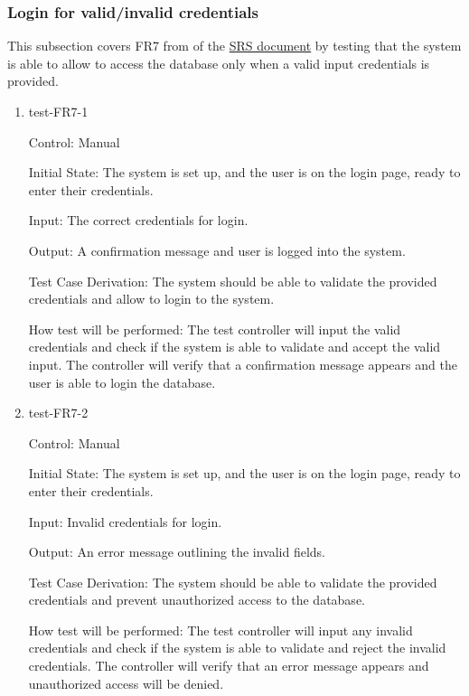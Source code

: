 \documentclass[12pt, titlepage]{article}
\begin{document}
\subsubsection{Login for valid/invalid credentials} \label{section:4.1.4}

This subsection covers FR7 from of the \href{https://github.com/Inreet-Kaur/capstone/blob/main/docs/SRS/SRS.pdf} {SRS document} by testing that the system is able to allow to access the database only when a valid input credentials is provided.

\begin{enumerate}

\item{test-FR7-1} \label{test-FR7-1}

Control: Manual

Initial State:  The system is set up, and the user is on the login page, ready to enter their credentials.

Input: The correct credentials for login.

Output: A confirmation message and user is logged into the system.

Test Case Derivation: The system should be able to validate the provided credentials and allow to login to the system.

How test will be performed: The test controller will input the valid credentials and check if the system is able to validate and accept the valid input. The controller will verify that a confirmation message appears and the user is able to login the database.


\item{test-FR7-2} \label{test-FR7-2}

Control: Manual

Initial State:  The system is set up, and the user is on the login page, ready to enter their credentials.

Input: Invalid credentials for login.

Output: An error message outlining the invalid fields.

Test Case Derivation: The system should be able to validate the provided credentials and prevent unauthorized access to the database.

How test will be performed: The test controller will input any invalid credentials and check if the system is able to validate and reject the invalid credentials. The controller will verify that an error message appears and unauthorized access will be denied.

\end{enumerate}
\end{document}
